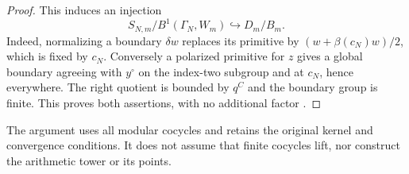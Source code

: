 \begin{proof}
This induces an injection
\[
       S_{N,m}/B^1(\Gamma_N,W_m)\hookrightarrow D_m/B_m.
\]
Indeed, normalizing a boundary $\delta w$ replaces its primitive
by $(w+\beta(c_N)w)/2$, which is fixed by $c_N$. Conversely a
polarized primitive for $z$ gives a global boundary agreeing with
$y^\circ$ on the index-two subgroup and at $c_N$, hence everywhere.
The right quotient is bounded by $q^C$ and the boundary group is
finite. This proves both assertions, with no additional factor
\cite{alpo-tower-detection}.
\end{proof}

The argument uses all modular cocycles and retains the original
kernel and convergence conditions. It does not assume that finite
cocycles lift, nor construct the arithmetic tower or its points.
